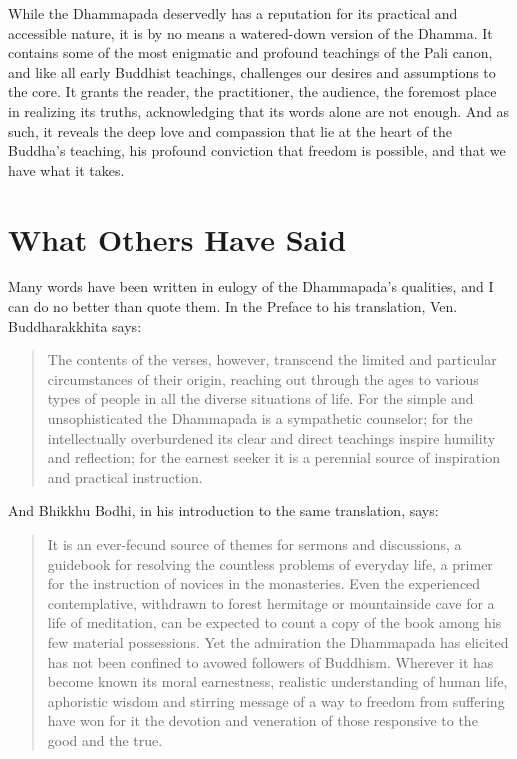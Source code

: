 \documentclass[12pt,openany]{book}%
\begin{document}
While the Dhammapada deservedly has a reputation for its practical and accessible nature, it is by no means a watered-down version of the Dhamma. It contains some of the most enigmatic and profound teachings of the Pali canon, and like all early Buddhist teachings, challenges our desires and assumptions to the core. It grants the reader, the practitioner, the audience, the foremost place in realizing its truths, acknowledging that its words alone are not enough. And as such, it reveals the deep love and compassion that lie at the heart of the Buddha’s teaching, his profound conviction that freedom is possible, and that we have what it takes.

\section*{What Others Have Said}

Many words have been written in eulogy of the Dhammapada’s qualities, and I can do no better than quote them. In the Preface to his translation, Ven. Buddharakkhita says:

\begin{quotation}%
The contents of the verses, however, transcend the limited and particular circumstances of their origin, reaching out through the ages to various types of people in all the diverse situations of life. For the simple and unsophisticated the Dhammapada is a sympathetic counselor; for the intellectually overburdened its clear and direct teachings inspire humility and reflection; for the earnest seeker it is a perennial source of inspiration and practical instruction.

%
\end{quotation}

And Bhikkhu Bodhi, in his introduction to the same translation, says:

\begin{quotation}%
It is an ever-fecund source of themes for sermons and discussions, a guidebook for resolving the countless problems of everyday life, a primer for the instruction of novices in the monasteries. Even the experienced contemplative, withdrawn to forest hermitage or mountainside cave for a life of meditation, can be expected to count a copy of the book among his few material possessions. Yet the admiration the Dhammapada has elicited has not been confined to avowed followers of Buddhism. Wherever it has become known its moral earnestness, realistic understanding of human life, aphoristic wisdom and stirring message of a way to freedom from suffering have won for it the devotion and veneration of those responsive to the good and the true.

%
\end{quotation}
\end{document}
